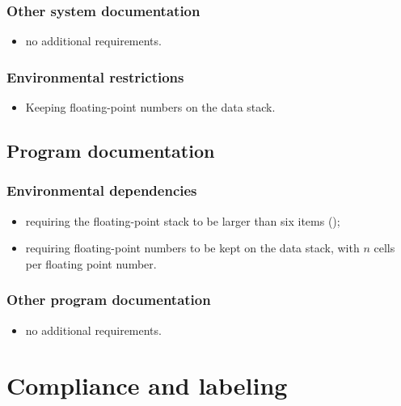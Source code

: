 \subsubsection{Other system documentation} %
\begin{itemize}
\item no additional requirements.
\end{itemize}

\subsubsection{Environmental restrictions} %
\label{float:restrictions}

\begin{itemize}
\item Keeping floating-point numbers on the data stack.
\end{itemize}

\subsection{Program documentation} %

\subsubsection{Environmental dependencies} %
\label{float:dependencies}

\begin{itemize}
\item requiring the floating-point stack to be larger than six items
	();
\item requiring floating-point numbers to be kept on the data stack,
	with $n$ cells per floating point number.
\end{itemize}

\subsubsection{Other program documentation} %
\begin{itemize}
\item no additional requirements.
\end{itemize}

\section{Compliance and labeling} %

